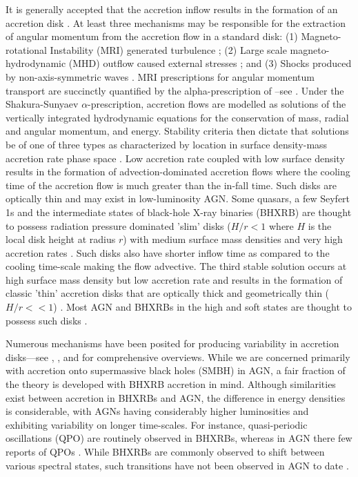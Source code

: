 \documentclass[a4paper,fleqn,usenatbib]{mnras}
\begin{document}
It is generally accepted that the accretion inflow results in the formation of an accretion disk \citep*{KoratkarBlaes99,PringleARAA}. At least three mechanisms may be responsible for the extraction of angular momentum from the accretion flow in a standard disk: (1) Magneto-rotational Instability (MRI) generated turbulence \citep*{BHI,BHRev}; (2) Large scale magneto-hydrodynamic (MHD) outflow caused external stresses \citep*{BlandfordPayne82}; and (3) Shocks produced by non-axis-symmetric waves \citep{FragileBlaes08}. MRI prescriptions for angular momentum transport are succinctly quantified by the alpha-prescription of \citet{ShakuraSunyaev73}--see \citet{BalbusPapaloizou99}. Under the Shakura-Sunyaev $\alpha$-prescription, accretion flows are modelled as solutions of the vertically integrated hydrodynamic equations for the conservation of mass, radial and angular momentum, and energy. Stability criteria then dictate that solutions be of one of three types as characterized by location in surface density-mass accretion rate phase space \citep{BlaesAccretion}. Low accretion rate coupled with low surface density results in the formation of advection-dominated accretion flows \citep{NarayanYi94,ChenAbramowicz95} where the cooling time of the accretion flow is much greater than the in-fall time. Such disks are optically thin and may exist in low-luminosity AGN. Some quasars, a few Seyfert 1s and the intermediate states of black-hole X-ray binaries (BHXRB) are thought to possess radiation pressure dominated 'slim' disks ($H/r < 1$ where $H$ is the local disk height at radius $r$) with medium surface mass densities and very high accretion rates \citep{Abramowicz88}. Such disks also have shorter inflow time as compared to the cooling time-scale making the flow advective. The third stable solution occurs at high surface mass density but low accretion rate and results in the formation of classic 'thin' accretion disks that are optically thick and geometrically thin ($H/r << 1$) \citep*{ShakuraSunyaev73,FKR}. Most AGN and BHXRBs in the high and soft states are thought to possess such disks \citep{BlaesAccretion}.

Numerous mechanisms have been posited for producing variability in accretion disks---see \citet{DoneAccretion}, \citet{MaccaroneAccretion}, and \citet{UttleyAccretion} for comprehensive overviews. While we are concerned primarily with accretion onto supermassive black holes (SMBH) in AGN, a fair fraction of the theory is developed with BHXRB accretion in mind. Although similarities exist between accretion in BHXRBs and AGN, the difference in energy densities is considerable, with AGNs having considerably higher luminosities and exhibiting variability on longer time-scales. For instance, quasi-periodic oscillations (QPO) are routinely observed in BHXRBs, whereas in AGN there few reports of QPOs \citep{GierlinskiQPO,Andrae13,GrindleyQPO}. While BHXRBs are commonly observed to shift between various spectral states, such transitions have not been observed in AGN to date \citep{Kelly11}.
\end{document}
